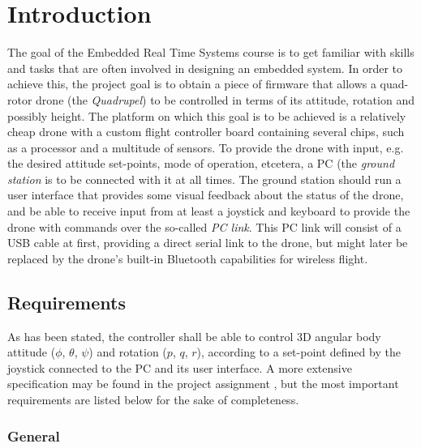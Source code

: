 \documentclass[final]{article}
\begin{document}
\section{Introduction}
The goal of the Embedded Real Time Systems course is to get familiar with skills and tasks that are often involved in designing an embedded system.
In order to achieve this, the project goal is to obtain a piece of firmware that allows a quad-rotor drone (the \emph{Quadrupel}) to be controlled in terms of its attitude, rotation and possibly height.
The platform on which this goal is to be achieved is a relatively cheap drone with a custom flight controller board containing several chips, such as a processor and a multitude of sensors.
To provide the drone with input, e.g. the desired attitude set-points, mode of operation, etcetera, a PC (the \emph{ground station} is to be connected with it at all times.
The ground station should run a user interface that provides some visual feedback about the status of the drone, and be able to receive input from at least a joystick and keyboard to provide the drone with commands over the so-called \emph{PC link}.
This PC link will consist of a USB cable at first, providing a direct serial link to the drone, but might later be replaced by the drone's built-in Bluetooth capabilities for wireless flight.

\subsection{Requirements}
As has been stated, the controller shall be able to control 3D angular body attitude ($\phi$, $\theta$, $\psi$) and rotation ($p$, $q$, $r$), according to a set-point defined by the joystick connected to the PC and its user interface.
A more extensive specification may be found in the project assignment \cite[3-6]{langendoen2017in4073}, but the most important requirements are listed below for the sake of completeness.

\subsubsection{General}
\end{document}
